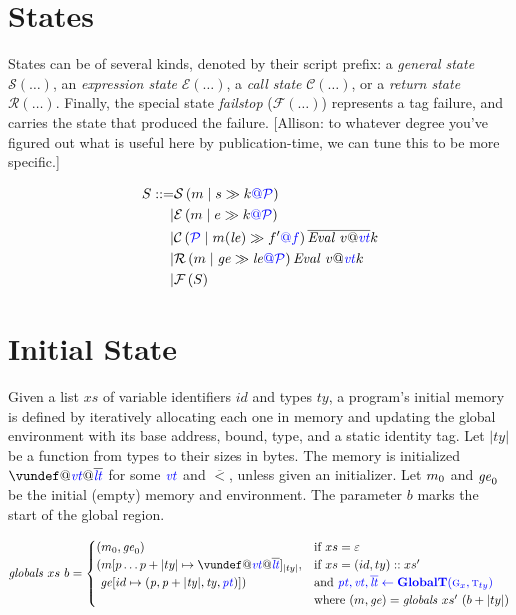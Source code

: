 \documentclass{llncs}
\begin{document}
\section{States}

States can be of several kinds, denoted by their script prefix: a {\em general state} \(\mathcal{S}(\dots)\),
an {\em expression state} \(\mathcal{E}(\dots)\), a {\em call state} \(\mathcal{C}(\dots)\), or a
{\em return state} \(\mathcal{R}(\dots)\). Finally, the special state {\em failstop} (\(\mathcal{F}(\dots)\))
represents a tag failure, and carries the state that produced the failure.
[Allison: to whatever degree you've figured out what is useful here by publication-time, we can
  tune this to be more specific.]

\[\begin{aligned}
S ::= & \sstate{\PCT}{\mem}{\stmt}{\cont} \\
| & \estate{\PCT}{\mem}{\expr}{\cont} \\
| & \cstate{f}{\PCT}{\mem}{\lenv}{f'}{\overline{\val{v}{\vt}}}{\cont} \\
| & \rstate{\PCT}{\mem}{\genv}{\lenv}{\val{v}{\vt}}{\cont} \\
| & \fstate{S} \\
\end{aligned}\]

\section{Initial State}

Given a list \(xs\) of variable identifiers \(id\) and types
\(ty\), a program's initial memory is defined by iteratively allocating each one
in memory and updating the global environment with its base address, bound, type,
and a static identity tag. Let \(|ty|\) be a function from types to their sizes
in bytes. The memory is initialized \(\vundef@\vt@\overline{\lt}\)
for some \(\vt\) and \(\overline{\lt}\), unless given an initializer.
Let \(\mem_0\) and \(\genv_0\) be the initial (empty) memory and environment.
The parameter \(b\) marks the start of the global region.


\[\mathit{globals} ~ xs ~ b =
\begin{cases}
  (\mem_0, \genv_0) & \textnormal{if } xs = \varepsilon \\
  (\mem[p \dots p+|ty| \mapsto \vundef@\vt@\overline{\lt}]_{|ty|}, & \textnormal{if } xs = (id,ty)::xs' \\
  ~ \genv[id \mapsto (\mathit{p, p+|ty|,ty,\pt})]) & \textnormal{and } \trule{\globaltres}{\globalt} \\
  & \textnormal{where } (\mem,\genv) = \mathit{globals} ~ xs' ~ (b + |ty|) \\
\end{cases}\]
\end{document}
